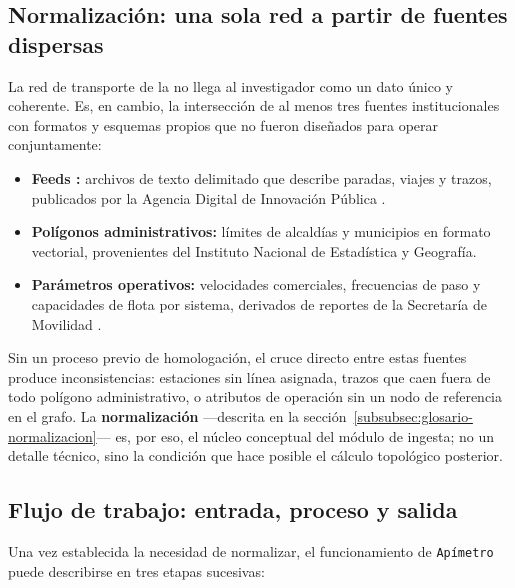 \subsection{Normalización: una sola red a partir de fuentes dispersas}
\label{subsec:apimetro-normalizacion}

La red de transporte de la \zmvm{} no llega al investigador como un dato único y
coherente. Es, en cambio, la intersección de al menos tres fuentes
institucionales con formatos y esquemas propios que no fueron diseñados para
operar conjuntamente:

\begin{itemize}
    \item \textbf{Feeds \gtfs:} archivos de texto delimitado que describe
    paradas, viajes y trazos, publicados por la Agencia Digital de Innovación
    Pública \citep{adip_gtfs_2024}.
    \item \textbf{Polígonos administrativos:} límites de alcaldías y municipios
    en formato vectorial, provenientes del Instituto Nacional de Estadística y
    Geografía.
    \item \textbf{Parámetros operativos:} velocidades comerciales, frecuencias
    de paso y capacidades de flota por sistema, derivados de reportes de la
    Secretaría de Movilidad \citep{semovi2020diagnostico}.
\end{itemize}

Sin un proceso previo de homologación, el cruce directo entre estas fuentes
produce inconsistencias: estaciones sin línea asignada, trazos que caen fuera de
todo polígono administrativo, o atributos de operación sin un nodo de referencia
en el grafo. La \textbf{normalización} \citep{ramakrishnan2003, postgresql2024}
—descrita en la sección~\ref{subsubsec:glosario-normalizacion}— es, por eso, el
núcleo conceptual del módulo de ingesta; no un detalle técnico, sino la
condición que hace posible el cálculo topológico posterior.

\subsection{Flujo de trabajo: entrada, proceso y salida}
\label{subsec:apimetro-flujo}

Una vez establecida la necesidad de normalizar, el funcionamiento de
\texttt{Apímetro} puede describirse en tres etapas sucesivas:

